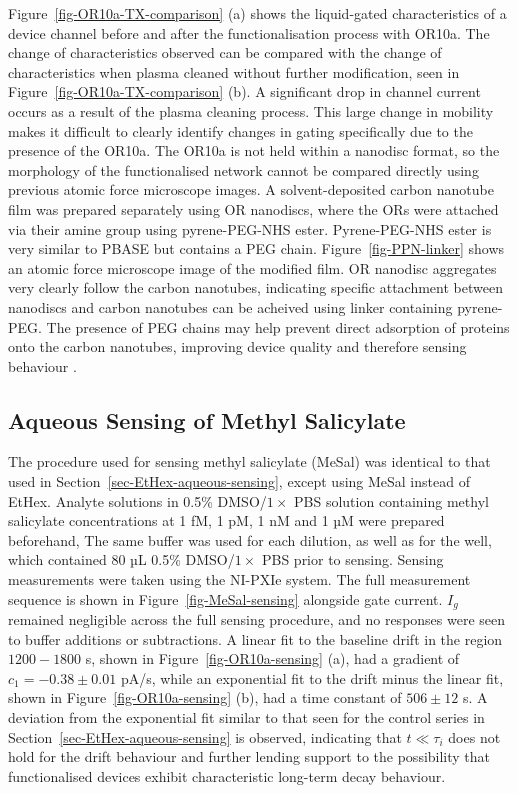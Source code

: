 \documentclass[
  a4paper,
]{scrbook}
\begin{document}
Figure~\ref{fig-OR10a-TX-comparison} (a) shows the liquid-gated
characteristics of a device channel before and after the
functionalisation process with OR10a. The change of characteristics
observed can be compared with the change of characteristics when plasma
cleaned without further modification, seen in
Figure~\ref{fig-OR10a-TX-comparison} (b). A significant drop in channel
current occurs as a result of the plasma cleaning process. This large
change in mobility makes it difficult to clearly identify changes in
gating specifically due to the presence of the OR10a. The OR10a is not
held within a nanodisc format, so the morphology of the functionalised
network cannot be compared directly using previous atomic force
microscope images. A solvent-deposited carbon nanotube film was prepared
separately using OR nanodiscs, where the ORs were attached via their
amine group using pyrene-PEG-NHS ester. Pyrene-PEG-NHS ester is very
similar to PBASE but contains a PEG chain. Figure~\ref{fig-PPN-linker}
shows an atomic force microscope image of the modified film. OR nanodisc
aggregates very clearly follow the carbon nanotubes, indicating specific
attachment between nanodiscs and carbon nanotubes can be acheived using
linker containing pyrene-PEG. The presence of PEG chains may help
prevent direct adsorption of proteins onto the carbon nanotubes,
improving device quality and therefore sensing behaviour
\autocite{Star2003a,Chen2004}.

\hypertarget{sec-MeSal-aqueous-sensing}{%
\subsection{Aqueous Sensing of Methyl
Salicylate}\label{sec-MeSal-aqueous-sensing}}

The procedure used for sensing methyl salicylate (MeSal) was identical
to that used in Section~\ref{sec-EtHex-aqueous-sensing}, except using
MeSal instead of EtHex. Analyte solutions in 0.5\% DMSO/\(1 \times\) PBS
solution containing methyl salicylate concentrations at 1 fM, 1 pM, 1 nM
and 1 µM were prepared beforehand, The same buffer was used for each
dilution, as well as for the well, which contained 80 µL 0.5\%
DMSO/\(1 \times\) PBS prior to sensing. Sensing measurements were taken
using the NI-PXIe system. The full measurement sequence is shown in
Figure~\ref{fig-MeSal-sensing} alongside gate current. \(I_g\) remained
negligible across the full sensing procedure, and no responses were seen
to buffer additions or subtractions. A linear fit to the baseline drift
in the region \(1200-1800\) s, shown in Figure~\ref{fig-OR10a-sensing}
(a), had a gradient of \(c_1 = -0.38\pm0.01\) pA/s, while an exponential
fit to the drift minus the linear fit, shown in
Figure~\ref{fig-OR10a-sensing} (b), had a time constant of
\(506 \pm 12\) s. A deviation from the exponential fit similar to that
seen for the control series in Section~\ref{sec-EtHex-aqueous-sensing}
is observed, indicating that \(t\ll\tau_i\) does not hold for the drift
behaviour and further lending support to the possibility that
functionalised devices exhibit characteristic long-term decay behaviour.
\end{document}
